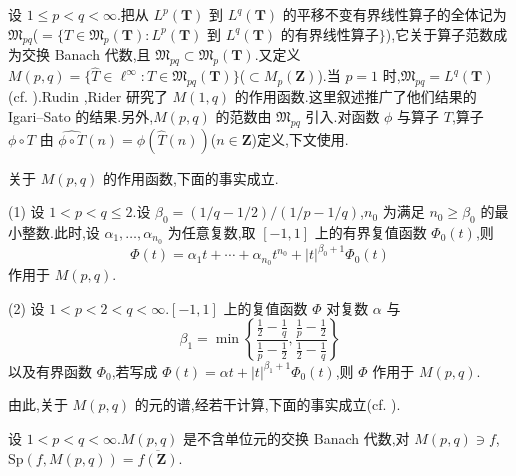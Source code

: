 设 $1 \leq p < q < \infty$.把从 $L^{p}(\mathbf{T})$ 到 $L^{q}(\mathbf{T})$ 的平移不变有界线性算子的全体记为 $\mathfrak{M}_{pq}$($= \{T \in \mathfrak{M}_{p}(\mathbf{T}): L^{p}(\mathbf{T})$ 到 $L^{q}(\mathbf{T})$ 的有界线性算子$\}$),它关于算子范数成为交换 Banach 代数,且 $\mathfrak{M}_{pq} \subset \mathfrak{M}_{p}(\mathbf{T})$.又定义 $M(p,q) = \{\hat{T} \in \ell^{\infty}: T \in \mathfrak{M}_{pq}(\mathbf{T})\}$($\subset M_{p}(\mathbf{Z})$).当 $p = 1$ 时,$\mathfrak{M}_{pq} = L^{q}(\mathbf{T})$(cf. \cite{ch3:9}).Rudin \cite{ch3:41},Rider \cite{ch3:40} 研究了 $M(1, q)$ 的作用函数.这里叙述推广了他们结果的 Igari--Sato \cite{ch3:26} 的结果.另外,$M(p,q)$ 的范数由 $\mathfrak{M}_{pq}$ 引入.对函数 $\phi$ 与算子 $T$,算子 $\phi \circ T$ 由 $\widehat{\phi \circ T}(n) = \phi(\hat{T}(n))$($n \in \mathbf{Z}$)定义,下文使用.

关于 $M(p,q)$ 的作用函数,下面的事实成立.

\begin{theorem}\label{thm:3.5.25}
(1) 设 $1 < p < q \leq 2$.设 $\beta_0 = (1/q - 1/2)/(1/p - 1/q)$,$n_0$ 为满足 $n_0 \geq \beta_0$ 的最小整数.此时,设 $\alpha_1, \ldots, \alpha_{n_0}$ 为任意复数,取 $[-1, 1]$ 上的有界复值函数 $\Phi_0(t)$,则
\begin{equation*}
\Phi(t) = \alpha_{1}t + \cdots + \alpha_{n_0}t^{n_0} + |t|^{\beta_0 + 1}\Phi_0(t)
\end{equation*}
作用于 $M(p,q)$.

(2) 设 $1 < p < 2 < q < \infty$.$[-1, 1]$ 上的复值函数 $\Phi$ 对复数 $\alpha$ 与
\begin{equation*}
\beta_{1} = \min\left\{\frac{\frac{1}{2} - \frac{1}{q}}{\frac{1}{p} - \frac{1}{2}}, \frac{\frac{1}{p} - \frac{1}{2}}{\frac{1}{2} - \frac{1}{q}}\right\}
\end{equation*}
以及有界函数 $\Phi_{0}$,若写成 $\Phi(t)=\alpha t+|t|^{\beta_{1}+1}\Phi_{0}(t)$,则 $\Phi$ 作用于 $M(p,q)$.
\end{theorem}

由此,关于 $M(p,q)$ 的元的谱,经若干计算,下面的事实成立(cf. \cite{ch3:26}).

\begin{corollary}\label{cor:3.5.26}
\begin{sloppypar}
设 $1 < p < q < \infty$.$M(p,q)$ 是不含单位元的交换 Banach 代数,对 $M(p,q) \ni f$,$\mathrm{Sp}(f, M(p,q)) = \overline{f(\mathbf{Z})}$.
\end{sloppypar}
\end{corollary}

